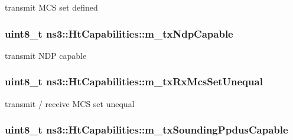 transmit M\+CS set defined 

\subsubsection[{\texorpdfstring{m\+\_\+tx\+Ndp\+Capable}{m_txNdpCapable}}]{\setlength{\rightskip}{0pt plus 5cm}uint8\+\_\+t ns3\+::\+Ht\+Capabilities\+::m\+\_\+tx\+Ndp\+Capable\hspace{0.3cm}{\ttfamily [private]}}\hypertarget{classns3_1_1HtCapabilities_a7e186a7bc6038344488f66095e186219}{}\label{classns3_1_1HtCapabilities_a7e186a7bc6038344488f66095e186219}


transmit N\+DP capable 

\subsubsection[{\texorpdfstring{m\+\_\+tx\+Rx\+Mcs\+Set\+Unequal}{m_txRxMcsSetUnequal}}]{\setlength{\rightskip}{0pt plus 5cm}uint8\+\_\+t ns3\+::\+Ht\+Capabilities\+::m\+\_\+tx\+Rx\+Mcs\+Set\+Unequal\hspace{0.3cm}{\ttfamily [private]}}\hypertarget{classns3_1_1HtCapabilities_a52305abc5d691050a73b26fdba6b8aea}{}\label{classns3_1_1HtCapabilities_a52305abc5d691050a73b26fdba6b8aea}


transmit / receive M\+CS set unequal 

\subsubsection[{\texorpdfstring{m\+\_\+tx\+Sounding\+Ppdus\+Capable}{m_txSoundingPpdusCapable}}]{\setlength{\rightskip}{0pt plus 5cm}uint8\+\_\+t ns3\+::\+Ht\+Capabilities\+::m\+\_\+tx\+Sounding\+Ppdus\+Capable\hspace{0.3cm}{\ttfamily [private]}}\hypertarget{classns3_1_1HtCapabilities_a3f5f8334d2821840cb0654280ef239c6}{}\label{classns3_1_1HtCapabilities_a3f5f8334d2821840cb0654280ef239c6}


